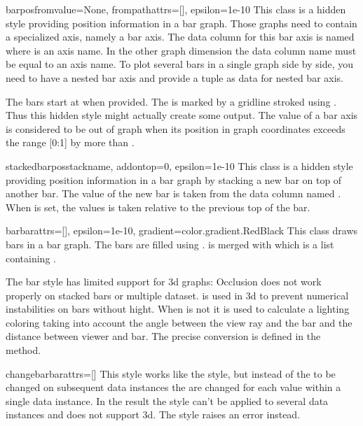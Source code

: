 \begin{classdesc}{barpos}{fromvalue=None, frompathattrs=[], epsilon=1e-10} %
  This class is a hidden style providing position information in a bar
  graph. Those graphs need to contain a specialized axis, namely a bar
  axis. The data column for this bar axis is named  where
   is an axis name. In the other graph dimension the data
  column name must be equal to an axis name. To plot several bars in a
  single graph side by side, you need to have a nested bar axis and
  provide a tuple as data for nested bar axis.

  The bars start at  when provided. The 
  is marked by a gridline stroked using . Thus this
  hidden style might actually create some output. The value of a bar
  axis is considered to be out of graph when its position in graph
  coordinates exceeds the range [0:1] by more than .
\end{classdesc} %

\begin{classdesc}{stackedbarpos}{stackname, addontop=0, epsilon=1e-10} %
  This class is a hidden style providing position information in a bar
  graph by stacking a new bar on top of another bar. The value of the
  new bar is taken from the data column named . When
   is set, the values is taken relative to the previous
  top of the bar.
\end{classdesc} %

\begin{classdesc}{bar}{barattrs=[], epsilon=1e-10, gradient=color.gradient.RedBlack} %
  This class draws bars in a bar graph. The bars are filled using
  .  is merged with 
  which is a list containing .

  The bar style has limited support for 3d graphs: Occlusion does not
  work properly on stacked bars or multiple dataset.  is
  used in 3d to prevent numerical instabilities on bars without hight.
  When  is not  it is used to calculate a
  lighting coloring taking into account the angle between the view ray
  and the bar and the distance between viewer and bar. The precise
  conversion is defined in the  method.
\end{classdesc} %

\begin{classdesc}{changebar}{barattrs=[]} %
  This style works like the  style, but instead of the
   to be changed on subsequent data instances the
   are changed for each value within a single data
  instance. In the result the style can't be applied to several data
  instances and does not support 3d. The style raises an error instead.
\end{classdesc} %


